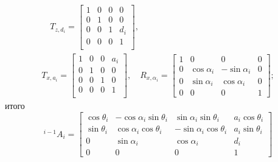 \begin{enumerate}
\begin{gather}
        \quad
        T_{z, d_i} =
        \begin{bmatrix}
            1 & 0 & 0 & 0\\
            0 & 1 & 0 & 0\\
            0 & 0 & 1 & d_i\\
            0 & 0 & 0 & 1\\
        \end{bmatrix}\!\!,\\
        T_{x, a_i} =
        \begin{bmatrix}
            1 & 0 & 0 & a_i\\
            0 & 1 & 0 & 0\\
            0 & 0 & 1 & 0\\
            0 & 0 & 0 & 1\\
        \end{bmatrix}\!\!,
        \quad
        R_{x, \alpha_i} =
        \begin{bmatrix}
            1 & 0 & 0 & 0\\
            0 & \cos\alpha_i & -\sin\alpha_i & 0\\
            0 & \sin\alpha_i &  \cos\alpha_i & 0\\
            0 & 0 & 0 & 1
        \end{bmatrix}\!\!;
    \end{gather}
    итого
    \begin{equation}
        {}^{i-1}A_i =
        \begin{bmatrix}
            \cos\theta_i & - \cos\alpha_i \sin\theta_i & \sin\alpha_i \sin\theta_i & a_{i} \cos\theta_i\\
            \sin\theta_i & \cos\alpha_i \cos\theta_i & - \sin\alpha_i \cos\theta_i & a_{i} \sin\theta_i\\
            0 & \sin\alpha_i & \cos\alpha_i & d_{i}\\
            0 & 0 & 0 & 1
        \end{bmatrix}
    \end{equation}
\end{enumerate}


